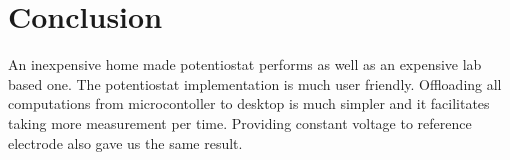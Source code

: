 \section{Conclusion}

An inexpensive home made potentiostat performs as well as an expensive lab based one. 
The potentiostat implementation is  much user friendly. Offloading all computations from microcontoller to desktop is much simpler and it facilitates taking more measurement per time. Providing constant voltage to reference electrode also gave us the same result.